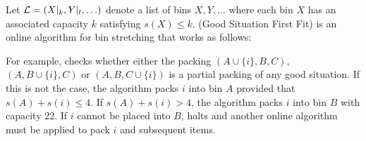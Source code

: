 \begin{dfn}\label{dfn:gsff}
Let ${\mathcal L}=(X|_k, Y|_l, \ldots)$ denote a list of bins $X,Y, \ldots $ where each
bin $X$ has an associated capacity $k$ satisfying $s(X)\leq k$.
\GSFF{$\calL$} (Good Situation First Fit) is an online algorithm for bin stretching that works as follows:

\vspace{1.5ex}
\end{dfn}

For example,  checks whether
either the packing $(A\cup \{i\},B,C)$, $(A,B\cup \{i\},C)$ or $(A,B,C\cup \{i\})$ is a partial packing of any good
situation. If this is not the case, the algorithm packs $i$ into bin
$A$ provided that $s(A)+s(i)\leq 4$. If $s(A) + s(i)>4$, the algorithm
packs $i$ into bin $B$ with capacity $22$. If $i$ cannot be placed
into $B$,  halts and another
online algorithm must be applied to pack $i$ and subsequent items.